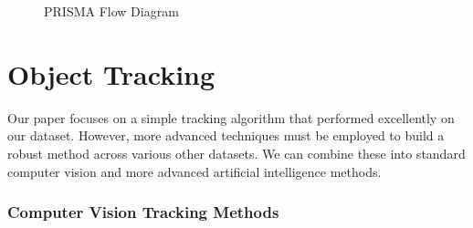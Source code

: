 \begin{figure}[hbp]
\begin{tikzpicture}[node distance=1.5cm, scale=0.65, every node/.style={transform shape, font=\fontsize{9}{10}\selectfont}]


    \end{tikzpicture}
    \caption{PRISMA Flow Diagram}
    \label{fig:prisma}
\end{figure}

\section{Object Tracking}

Our paper focuses on a simple tracking algorithm that performed excellently on our dataset. However, more advanced techniques must be employed to build a robust method across various other datasets. We can combine these into standard computer vision and more advanced artificial intelligence methods.

\subsubsection{Computer Vision Tracking Methods}

